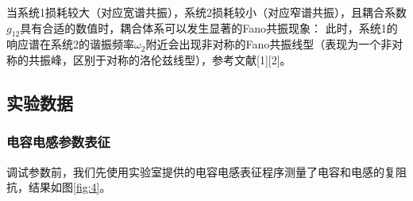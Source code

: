 \documentclass[12pt, a4paper]{ctexart}
\begin{document}
当系统1损耗较大（对应宽谱共振），系统2损耗较小（对应窄谱共振），且耦合系数$g_{12}$具有合适的数值时，耦合体系可以发生显著的Fano共振现象：
此时，系统1的响应谱在系统2的谐振频率$\omega_2$附近会出现非对称的Fano共振线型（表现为一个非对称的共振峰，区别于对称的洛伦兹线型），参考文献[1][2]。

\subsection{实验数据}

\subsubsection{电容电感参数表征}

调试参数前，我们先使用实验室提供的电容电感表征程序测量了电容和电感的复阻抗，结果如图\ref{fig:4}。
\end{document}
